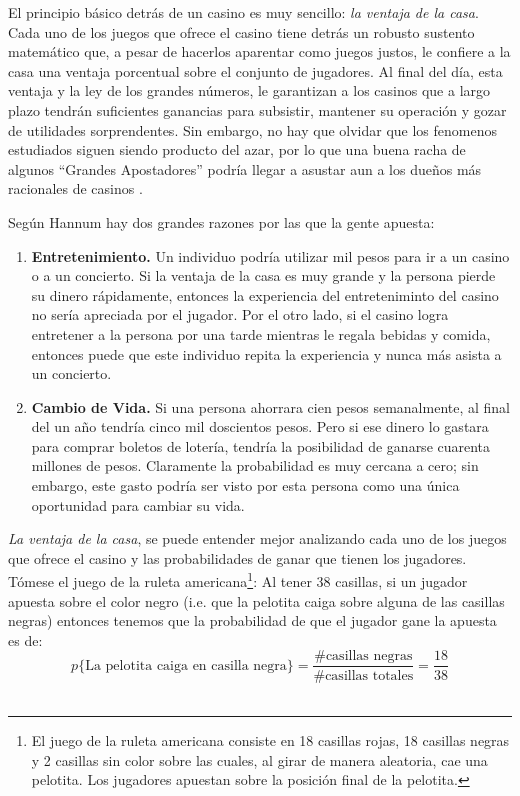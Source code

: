 El principio básico detrás de un casino es muy sencillo: \emph{la ventaja de la casa}. Cada uno de los juegos que ofrece el casino tiene detrás un robusto sustento matemático que, a pesar de hacerlos aparentar como juegos justos, le confiere a la casa una ventaja porcentual sobre el conjunto de jugadores. Al final del día, esta ventaja y la ley de los grandes números, le garantizan a los casinos que a largo plazo tendrán suficientes ganancias para subsistir, mantener su operación y gozar de utilidades sorprendentes. Sin embargo, no hay que olvidar que los fenomenos estudiados siguen siendo producto del azar, por lo que una buena racha de algunos ``Grandes Apostadores'' podría llegar a asustar aun a los dueños  más racionales de casinos \cite{hannum2005practical}.



Según Hannum \cite{hannum2005practical} hay dos grandes razones por las que la gente apuesta:

\begin{enumerate}
	\item \textbf{Entretenimiento.} Un individuo podría utilizar mil pesos para ir a un casino o a un concierto. Si la ventaja de la casa es muy grande y la persona pierde su dinero rápidamente, entonces la experiencia del entreteniminto del casino no sería apreciada por el jugador. Por el otro lado, si el casino logra entretener a la persona por una tarde mientras le regala bebidas y comida, entonces puede que este individuo repita la experiencia y nunca más asista a un concierto.
	\item \textbf{Cambio de Vida.} Si una persona ahorrara cien pesos semanalmente, al final del un año tendría cinco mil doscientos pesos. Pero si ese dinero lo gastara para comprar boletos de lotería, tendría la posibilidad de ganarse cuarenta millones de pesos. Claramente la probabilidad es muy cercana a cero; sin embargo, este gasto podría ser visto por esta persona como una única oportunidad para cambiar su vida.

\end{enumerate}

\emph{La ventaja de la casa}, se puede entender mejor analizando cada uno de los juegos que ofrece el casino y las probabilidades de ganar que tienen los jugadores. Tómese el juego de la ruleta americana\footnote{El juego de la ruleta americana consiste en 18 casillas rojas, 18 casillas negras y 2 casillas sin color sobre las cuales, al girar de manera aleatoria, cae una pelotita. Los jugadores apuestan sobre la posición final de la pelotita.}:
Al tener $38$ casillas, si un jugador apuesta sobre el color negro (i.e. que la pelotita caiga sobre alguna de las casillas negras) entonces tenemos que la probabilidad de que el jugador gane la apuesta es de:\\
\[p\{\text{La pelotita caiga en casilla negra}\} = \frac{\text{\# casillas negras}}{ \text{\# casillas totales}}  = \frac{18}{38}\]\\

